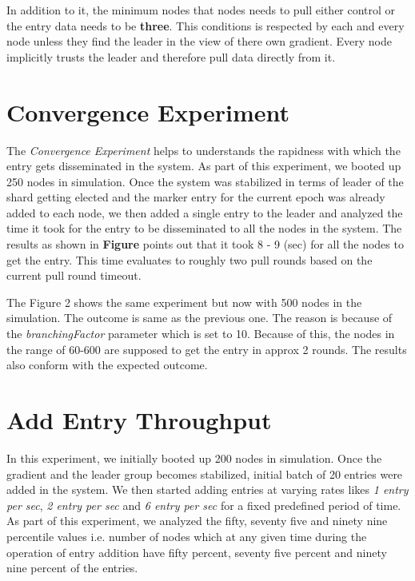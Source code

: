 \documentclass[12pt,a4paper,twoside,openright]{book}
\begin{document}
In addition to it, the minimum nodes that nodes needs to pull either control or the entry data needs to be \textbf{three}. This conditions is respected by each and every node unless they find the leader in the view of there own gradient. Every node implicitly trusts the leader and therefore pull data directly from it.




\section{Convergence Experiment}

The \textit{Convergence Experiment} helps to understands the rapidness with which the entry gets disseminated in the system. As part of this experiment, we booted up 250 nodes in simulation. Once the system was stabilized in terms of leader of the shard getting elected and the marker entry for the current epoch was already added to each node, we then added a single entry to the leader and analyzed the time it took for the entry to be disseminated to all the nodes in the system. The results as shown in \textbf{Figure} points out that it took 8 - 9 (sec) for all the nodes to get the entry. This time evaluates to roughly two pull rounds based on the current pull round timeout.


The Figure 2 shows the same experiment but now with 500 nodes in the simulation. The outcome is same as the previous one. The reason is because of the \textit{branchingFactor} parameter which is set to 10. Because of this, the nodes in the range of 60-600 are supposed to get the entry in approx 2 rounds. The results also conform with the expected outcome. 


\section{Add Entry Throughput}

In this experiment, we initially booted up 200 nodes in simulation. Once the gradient and the leader group becomes stabilized, initial batch of 20 entries were added in the system. We then started adding entries at varying rates likes \textit{1 entry per sec}, \textit{2 entry per sec} and  \textit{6 entry per sec} for a fixed predefined period of time. As part of this experiment, we analyzed the fifty, seventy five and ninety nine percentile values i.e. number of nodes which at any given time during the operation of entry addition have fifty percent, seventy five percent and ninety nine percent of the entries. 
\end{document}
